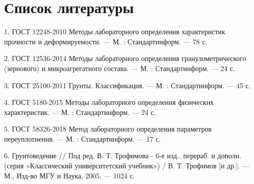
\chapter{Список литературы}

1. ГОСТ 12248-2010 Методы лабораторного определения характеристик
прочности и деформируемости. --- М. : Стандартинформ. --- 78 с.

2. ГОСТ 12536-2014 Методы лабораторного определения гранулометрического
(зернового) и микроагрегатного состава. --- М. : Стандартинформ.
--- 24 с.

3. ГОСТ 25100-2011 Грунты. Классификация. --- М. : Стандартинформ.
--- 45 с.

4. ГОСТ 5180-2015 Методы лабораторного определения физических характеристик. --- М. 
: Стандартинформ. --- 24 с.

5. ГОСТ 58326-2018 Метод лабораторного определения параметров переуплотнения. --- М. 
: Стандартинформ. --- 17 с.

6. Грунтоведение // Под ред. В. Т. Трофимова - 6-е изд., перераб. и дополн.
(серия «Классический университетский учебник») / В. Т. Трофимов
[и др.]. — М., Изд-во МГУ и Наука, 2005. — 1024 с.

